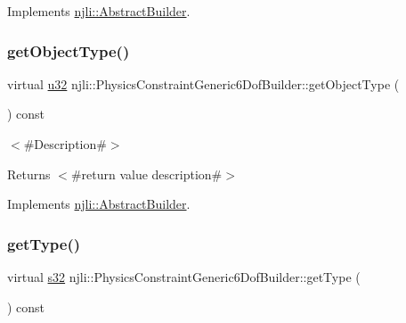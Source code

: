Implements \mbox{\hyperlink{classnjli_1_1_abstract_builder_a902f73ea78031b06aca183a417f3413b}{njli\+::\+Abstract\+Builder}}.

\mbox{\label{classnjli_1_1_physics_constraint_generic6_dof_builder_a111c5c229b075dc823ff35634f1f86d7}} 
\subsubsection{\texorpdfstring{get\+Object\+Type()}{getObjectType()}}
{\footnotesize\ttfamily virtual \mbox{\hyperlink{_util_8h_a10e94b422ef0c20dcdec20d31a1f5049}{u32}} njli\+::\+Physics\+Constraint\+Generic6\+Dof\+Builder\+::get\+Object\+Type (\begin{DoxyParamCaption}{ }\end{DoxyParamCaption}) const\hspace{0.3cm}{\ttfamily [virtual]}}

$<$\#\+Description\#$>$

\begin{DoxyReturn}{Returns}
$<$\#return value description\#$>$ 
\end{DoxyReturn}


Implements \mbox{\hyperlink{classnjli_1_1_abstract_builder_a0f2d344fcf697b167f4f2b1122b5fb33}{njli\+::\+Abstract\+Builder}}.

\mbox{\label{classnjli_1_1_physics_constraint_generic6_dof_builder_aef4d139d552e3631ffaa2eabde80741e}} 
\subsubsection{\texorpdfstring{get\+Type()}{getType()}}
{\footnotesize\ttfamily virtual \mbox{\hyperlink{_util_8h_aa62c75d314a0d1f37f79c4b73b2292e2}{s32}} njli\+::\+Physics\+Constraint\+Generic6\+Dof\+Builder\+::get\+Type (\begin{DoxyParamCaption}{ }\end{DoxyParamCaption}) const\hspace{0.3cm}{\ttfamily [virtual]}}

